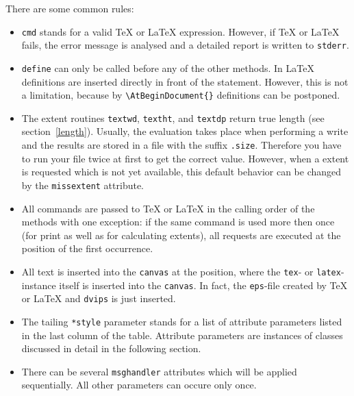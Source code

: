 There are some common rules:
\begin{itemize}
\item \verb|cmd| stands for a valid \TeX{} or \LaTeX{} expression.
However, if \TeX{} or \LaTeX{} fails, the error message is analysed
and a detailed report is written to \verb|stderr|.
\item \verb|define| can only be called before any of the other
methods. In \LaTeX{} definitions are inserted directly in front of
the \verb|| statement. However, this is not a
limitation, because by \verb|\AtBeginDocument{}| definitions can be
postponed.
\item The extent routines \verb|textwd|, \verb|textht|, and
\verb|textdp| return true \PyX{} length (see section~\ref{length}).
Usually, the evaluation takes place when performing a write and the
results are stored in a file with the suffix \verb|.size|. Therefore
you have to run your file twice at first to get the correct value.
However, when a extent is requested which is not yet available, this
default behavior can be changed by the \verb|missextent| attribute.
\item All commands are passed to \TeX{} or \LaTeX{} in the calling
order of the methods with one exception: if the same command is used
more then once (for print as well as for calculating extents), all
requests are executed at the position of the first occurrence.
\item All text is inserted into the \verb|canvas| at the position,
where the \verb|tex|- or \verb|latex|-instance itself is inserted into
the \verb|canvas|. In fact, the \verb|eps|-file created by \TeX{} or
\LaTeX{} and \verb|dvips| is just inserted.
\item The tailing \verb|*style| parameter stands for a list of
attribute parameters listed in the last column of the table. Attribute
parameters are instances of classes discussed in detail in the
following section.
\item There can be several \verb|msghandler| attributes which will be
applied sequentially. All other parameters can occure only once.
\end{itemize}


